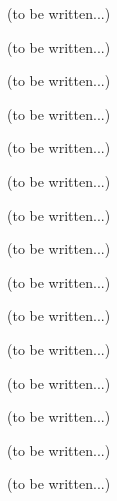 (to be written...)



(to be written...)



(to be written...)







(to be written...)



(to be written...)



(to be written...)



(to be written...)







(to be written...)



(to be written...)



(to be written...)







(to be written...)



(to be written...)



(to be written...)







(to be written...)



(to be written...)

\clearrightpage
\begin{appendices}
\end{appendices}

\clearrightpage
